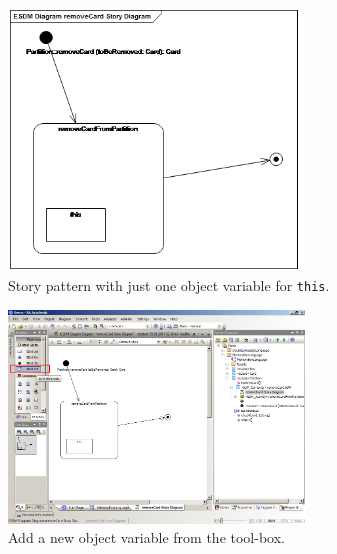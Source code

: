 \begin{figure}[htp]
\begin{center}
  \includegraphics[width=0.7\textwidth]{pics/sdmBilder/removeCard/sdm08RAW}
  \caption{Story pattern with just one object variable for \texttt{this}.}  
  \label{fig:sdm_complete_control_flow}
\end{center}
\end{figure}

\begin{figure}[htp]
\begin{center}
  \includegraphics[width=0.7\textwidth]{pics/sdmBilder/removeCard/sdm09RAW}
  \caption{Add a new object variable from the tool-box.}  
  \label{fig:tool_box}
\end{center}
\end{figure}

